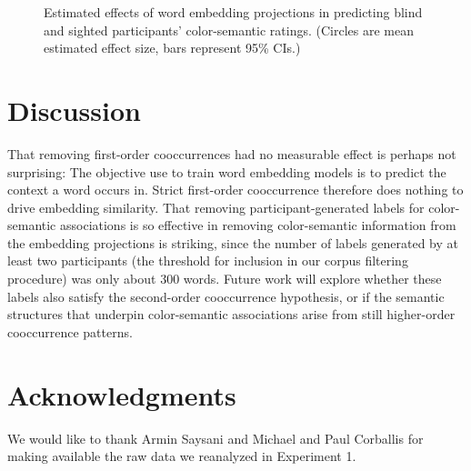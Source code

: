 \documentclass[10pt,letterpaper]{article}
\begin{document}
\begin{figure}[h!]
\begin{center}
\caption{Estimated effects of word embedding projections in predicting blind and sighted participants' color-semantic ratings. (Circles are mean estimated effect size, bars represent 95\% CIs.)}
\label{corpus_modification}
\end{center}
\end{figure}

\section{Discussion}
That removing first-order cooccurrences had no measurable effect is perhaps not surprising: The objective use to train word embedding models is to predict the context a word occurs in. Strict first-order cooccurrence therefore does nothing to drive embedding similarity. That removing participant-generated labels for color-semantic associations is so effective in removing color-semantic information from the embedding projections is striking, since the number of labels generated by at least two participants (the threshold for inclusion in our corpus filtering procedure) was only about 300 words. Future work will explore whether these labels also satisfy the second-order cooccurrence hypothesis, or if the semantic structures that underpin color-semantic associations arise from still higher-order cooccurrence patterns.

\section{Acknowledgments}
We would like to thank Armin Saysani and Michael and Paul Corballis for making available the raw data we reanalyzed in Experiment 1.



\setlength{\bibleftmargin}{.125in}
\setlength{\bibindent}{-\bibleftmargin}


\end{document}
